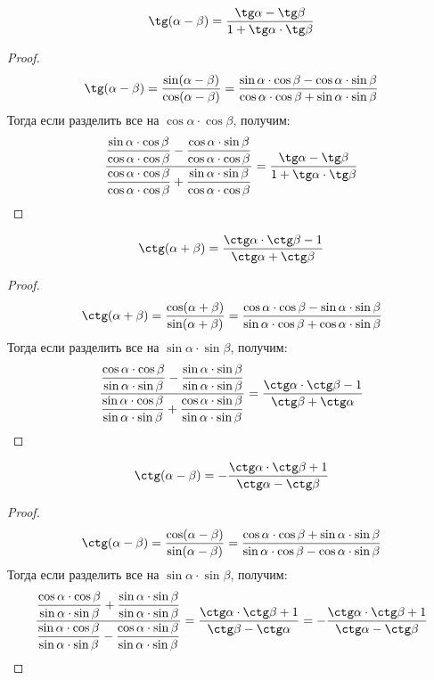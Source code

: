 \documentclass[12pt]{article}
\begin{document}
    \begin{statement}
        $$\tg(\alpha-\beta)=\dfrac{\tg\alpha-\tg\beta}{1+\tg\alpha\cdot\tg\beta}$$
    \end{statement}
    \begin{proof}
        $$\tg(\alpha-\beta)=\dfrac{\sin(\alpha-\beta)}{\cos(\alpha-\beta)}=\dfrac{\sin\alpha\cdot\cos\beta-\cos\alpha\cdot\sin\beta}{\cos\alpha\cdot\cos\beta+\sin\alpha\cdot\sin\beta}$$
        Тогда если разделить все на $\cos\alpha\cdot\cos\beta$, получим:
        $$\dfrac{\dfrac{\sin\alpha\cdot\cos\beta}{\cos\alpha\cdot\cos\beta}-\dfrac{\cos\alpha\cdot\sin\beta}{\cos\alpha\cdot\cos\beta}}{\dfrac{\cos\alpha\cdot\cos\beta}{\cos\alpha\cdot\cos\beta}+\dfrac{\sin\alpha\cdot\sin\beta}{\cos\alpha\cdot\cos\beta}}=\dfrac{\tg\alpha-\tg\beta}{1+\tg\alpha\cdot\tg\beta}$$
    \end{proof}
    \begin{statement}
        $$\ctg(\alpha+\beta)=\dfrac{\ctg\alpha\cdot\ctg\beta-1}{\ctg\alpha+\ctg\beta}$$
    \end{statement}
    \begin{proof}
        $$\ctg(\alpha+\beta)=\dfrac{\cos(\alpha+\beta)}{\sin(\alpha+\beta)}=\dfrac{\cos\alpha\cdot\cos\beta-\sin\alpha\cdot\sin\beta}{\sin\alpha\cdot\cos\beta+\cos\alpha\cdot\sin\beta}$$
        Тогда если разделить все на $\sin\alpha\cdot\sin\beta$, получим:
        $$\dfrac{\dfrac{\cos\alpha\cdot\cos\beta}{\sin\alpha\cdot\sin\beta}-\dfrac{\sin\alpha\cdot\sin\beta}{\sin\alpha\cdot\sin\beta}}{\dfrac{\sin\alpha\cdot\cos\beta}{\sin\alpha\cdot\sin\beta}+\dfrac{\cos\alpha\cdot\sin\beta}{\sin\alpha\cdot\sin\beta}}=\dfrac{\ctg\alpha\cdot\ctg\beta-1}{\ctg\beta+\ctg\alpha}$$
    \end{proof}
    \begin{statement}
        $$\ctg(\alpha-\beta)=-\dfrac{\ctg\alpha\cdot\ctg\beta+1}{\ctg\alpha-\ctg\beta}$$
    \end{statement}
    \begin{proof}
        $$\ctg(\alpha-\beta)=\dfrac{\cos(\alpha-\beta)}{\sin(\alpha-\beta)}=\dfrac{\cos\alpha\cdot\cos\beta+\sin\alpha\cdot\sin\beta}{\sin\alpha\cdot\cos\beta-\cos\alpha\cdot\sin\beta}$$
        Тогда если разделить все на $\sin\alpha\cdot\sin\beta$, получим:
        $$\dfrac{\dfrac{\cos\alpha\cdot\cos\beta}{\sin\alpha\cdot\sin\beta}+\dfrac{\sin\alpha\cdot\sin\beta}{\sin\alpha\cdot\sin\beta}}{\dfrac{\sin\alpha\cdot\cos\beta}{\sin\alpha\cdot\sin\beta}-\dfrac{\cos\alpha\cdot\sin\beta}{\sin\alpha\cdot\sin\beta}}=\dfrac{\ctg\alpha\cdot\ctg\beta+1}{\ctg\beta-\ctg\alpha}=-\dfrac{\ctg\alpha\cdot\ctg\beta+1}{\ctg\alpha-\ctg\beta}$$
    \end{proof}
\end{document}

